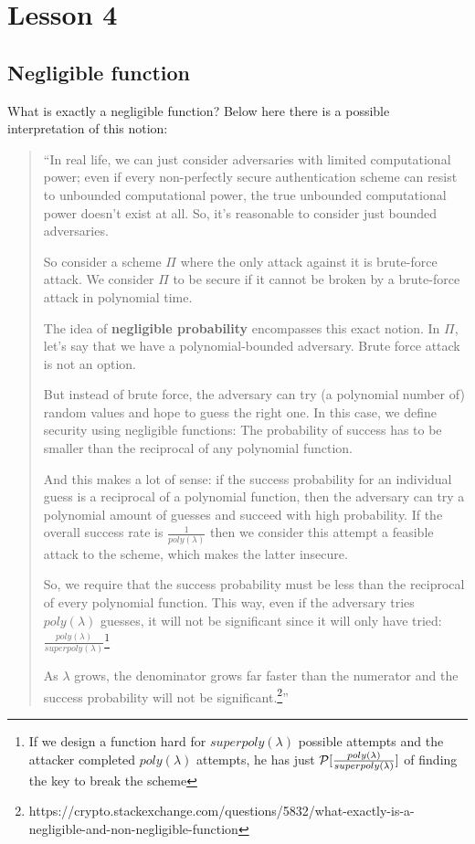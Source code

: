 \chapter*{Lesson 4}

\section{Negligible function}

What is exactly a negligible function? Below here there is a possible interpretation of this notion:
\begin{quotation}
    ``In real life, we can just consider adversaries with limited computational power; even if every non-perfectly secure authentication scheme can resist to unbounded computational power, the true unbounded computational power doesn't exist at all. So, it's reasonable to consider just bounded adversaries.

    So consider a scheme $\Pi$ where the only attack against it is brute-force attack. We consider $\Pi$ to be secure if it cannot be broken by a brute-force attack in polynomial time.

    The idea of \textbf{negligible probability} encompasses this exact notion. In $\Pi$, let's say that we have a polynomial-bounded adversary. Brute force attack is not an option.

    But instead of brute force, the adversary can try (a polynomial number of) random values and hope to guess the right one. In this case, we define security using negligible functions: The probability of success has to be smaller than the reciprocal of any polynomial function.

    And this makes a lot of sense: if the success probability for an individual guess is a reciprocal of a polynomial function, then the adversary can try a polynomial amount of guesses and succeed with high probability. If the overall success rate is $\frac{1}{poly(\lambda)}$ then we consider this attempt a feasible attack to the scheme, which makes the latter insecure.

    So, we require that the success probability must be less than the reciprocal of every polynomial function. This way, even if the adversary tries $poly(\lambda)$ guesses, it will not be significant since it will only have tried: $\frac{poly(\lambda)}{superpoly(\lambda)}$\footnote{If we design a function hard for $superpoly(\lambda)$ possible attempts and the attacker completed $poly(\lambda)$ attempts, he has just $ \P [\frac{poly(\lambda)}{superpoly(\lambda)}] $ of finding the key to break the scheme}

    As $\lambda$ grows, the denominator grows far faster than the numerator and the success probability will not be significant.\footnote{https://crypto.stackexchange.com/questions/5832/what-exactly-is-a-negligible-and-non-negligible-function}''

\end{quotation}

